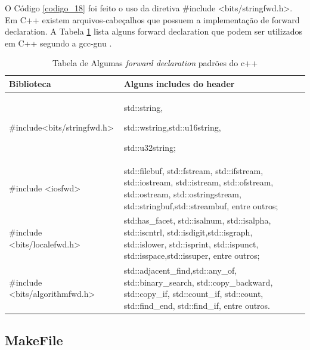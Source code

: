O Código \ref{codigo_18} foi feito o uso da diretiva \#include
 <bits/stringfwd.h>. Em C++  existem arquivos-cabeçalhos que possuem a
 implementação de forward declaration. A Tabela \ref{tab:tabela_04} lista 
 alguns forward declaration que podem ser utilizados em C++ segundo
 a gcc-gnu \cite{gcc-api}.

\begin{table}[h]
    \label{tab:tabela_04}
    \caption {Tabela de Algumas \textit{forward 
              declaration} padrões do c++}
    \centering
    \begin{tabular}{ |l|p{10cm} | l|p{10cm} |}
    \hline
    Biblioteca & Alguns includes do header\\
    \hline

    \#include<bits/stringfwd.h> & std::string,
 
                                 std::wstring,std::u16string, 

                                 std::u32string;\\
    \hline
    \#include <iosfwd> & std::filebuf, std::fstream,
                        std::ifstream, std::iostream,
                        std::istream, std::ofstream,
                        std::ostream, std::ostringstream,
                        std::stringbuf,std::streambuf,
                        entre outros;\\
    \hline
    \#include <bits/localefwd.h> & std:has\_facet, std::isalnum,
                                  std::isalpha, std::iscntrl,
                                  std::isdigit,std::isgraph,
                                  std::islower, std::isprint,
                                  std::ispunct,
                                  std::isspace,std::issuper,
                                  entre outros;\\
    \hline
    \#include <bits/algorithmfwd.h> & std::adjacent\_find,std::any\_of,
                                     std::binary\_search, 
                                     std::copy\_backward, std::copy\_if,
                                     std::count\_if, std::count,
                                     std::find\_end, std::find\_if,
                                     entre outros.\\
    \hline
  \end{tabular}
\end{table}


\subsection{MakeFile}\label{Makefile_section}


